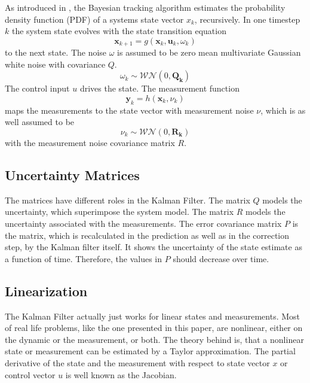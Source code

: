 \documentclass[conference]{IEEEtran}
\begin{document}
As introduced in \cite{Kalman1960}, the Bayesian tracking algorithm estimates the probability density function (PDF) of a systems state vector $x_k$, recursively. In one timestep $k$ the system state evolves with the state transition equation
\begin{equation}\label{statetransitionequation}
\boldsymbol{x}_{k+1}=g(\boldsymbol{x}_k, \boldsymbol{u}_k,\omega_k)
\end{equation}
to the next state. The noise $\omega$ is assumed to be zero mean multivariate Gaussian white noise with covariance $Q$.
\begin{equation}\omega_{k} \sim \mathcal{WN} (0, \boldsymbol{Q_k})\end{equation}
The control input $u$ drives the state.
The measurement function
\begin{equation}\label{measurementfunction}\boldsymbol{y}_{k}=h(\boldsymbol{x}_k,\nu_k)\end{equation} maps the measurements to the state vector with measurement noise $\nu$, which is as well assumed to be
\begin{equation}\nu_{k} \sim \mathcal{WN} (0, \boldsymbol{R_k})\end{equation}
with the measurement noise covariance matrix $R$.

\subsection{Uncertainty Matrices}

The matrices have different roles in the Kalman Filter. The matrix $Q$ models the uncertainty, which superimpose the system model. The matrix $R$ models the uncertainty associated with the measurements. The error covariance matrix $P$ is the matrix, which is recalculated in the prediction as well as in the correction step, by the Kalman filter itself. It shows the uncertainty of the state estimate as a function of time. Therefore, the values in $P$ should decrease over time.

\subsection{Linearization}

The Kalman Filter actually just works for linear states and measurements. Most of real life problems, like the one presented in this paper, are nonlinear, either on the dynamic or the measurement, or both.
The theory behind is, that a nonlinear state or measurement can be estimated by a Taylor approximation. The partial derivative of the state and the measurement with respect to state vector $x$ or control vector $u$ is well known as the Jacobian.
\end{document}
